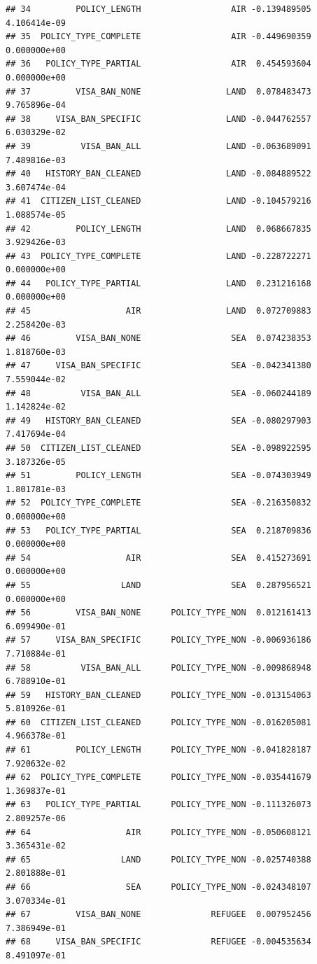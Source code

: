 \documentclass[]{article}
\begin{document}
\begin{verbatim}
## 34         POLICY_LENGTH                  AIR -0.139489505 4.106414e-09
## 35  POLICY_TYPE_COMPLETE                  AIR -0.449690359 0.000000e+00
## 36   POLICY_TYPE_PARTIAL                  AIR  0.454593604 0.000000e+00
## 37         VISA_BAN_NONE                 LAND  0.078483473 9.765896e-04
## 38     VISA_BAN_SPECIFIC                 LAND -0.044762557 6.030329e-02
## 39          VISA_BAN_ALL                 LAND -0.063689091 7.489816e-03
## 40   HISTORY_BAN_CLEANED                 LAND -0.084889522 3.607474e-04
## 41  CITIZEN_LIST_CLEANED                 LAND -0.104579216 1.088574e-05
## 42         POLICY_LENGTH                 LAND  0.068667835 3.929426e-03
## 43  POLICY_TYPE_COMPLETE                 LAND -0.228722271 0.000000e+00
## 44   POLICY_TYPE_PARTIAL                 LAND  0.231216168 0.000000e+00
## 45                   AIR                 LAND  0.072709883 2.258420e-03
## 46         VISA_BAN_NONE                  SEA  0.074238353 1.818760e-03
## 47     VISA_BAN_SPECIFIC                  SEA -0.042341380 7.559044e-02
## 48          VISA_BAN_ALL                  SEA -0.060244189 1.142824e-02
## 49   HISTORY_BAN_CLEANED                  SEA -0.080297903 7.417694e-04
## 50  CITIZEN_LIST_CLEANED                  SEA -0.098922595 3.187326e-05
## 51         POLICY_LENGTH                  SEA -0.074303949 1.801781e-03
## 52  POLICY_TYPE_COMPLETE                  SEA -0.216350832 0.000000e+00
## 53   POLICY_TYPE_PARTIAL                  SEA  0.218709836 0.000000e+00
## 54                   AIR                  SEA  0.415273691 0.000000e+00
## 55                  LAND                  SEA  0.287956521 0.000000e+00
## 56         VISA_BAN_NONE      POLICY_TYPE_NON  0.012161413 6.099490e-01
## 57     VISA_BAN_SPECIFIC      POLICY_TYPE_NON -0.006936186 7.710884e-01
## 58          VISA_BAN_ALL      POLICY_TYPE_NON -0.009868948 6.788910e-01
## 59   HISTORY_BAN_CLEANED      POLICY_TYPE_NON -0.013154063 5.810926e-01
## 60  CITIZEN_LIST_CLEANED      POLICY_TYPE_NON -0.016205081 4.966378e-01
## 61         POLICY_LENGTH      POLICY_TYPE_NON -0.041828187 7.920632e-02
## 62  POLICY_TYPE_COMPLETE      POLICY_TYPE_NON -0.035441679 1.369837e-01
## 63   POLICY_TYPE_PARTIAL      POLICY_TYPE_NON -0.111326073 2.809257e-06
## 64                   AIR      POLICY_TYPE_NON -0.050608121 3.365431e-02
## 65                  LAND      POLICY_TYPE_NON -0.025740388 2.801888e-01
## 66                   SEA      POLICY_TYPE_NON -0.024348107 3.070334e-01
## 67         VISA_BAN_NONE              REFUGEE  0.007952456 7.386949e-01
## 68     VISA_BAN_SPECIFIC              REFUGEE -0.004535634 8.491097e-01

\end{verbatim}
\end{document}
